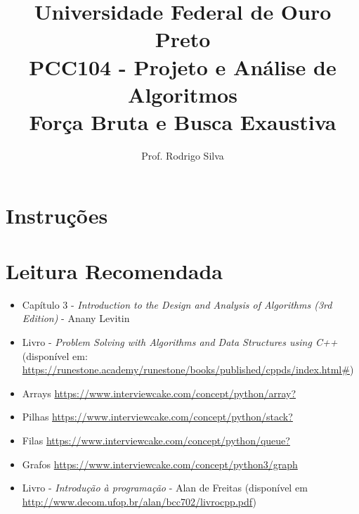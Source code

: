 \documentclass{article}
\title{\vspace{-2 cm}Universidade Federal de Ouro Preto \\ PCC104 - Projeto e Análise de Algoritmos \\ Força Bruta e Busca Exaustiva}
\author{Prof. Rodrigo Silva}
\begin{document}
\maketitle

\section*{Instruções}




\section{Leitura Recomendada}

\begin{itemize}
    \item Capítulo 3 - \textit{Introduction to the Design and Analysis of Algorithms (3rd Edition)} - Anany Levitin 
    \item Livro - \textit{Problem Solving with Algorithms and Data Structures using C++} (disponível em: \url{https://runestone.academy/runestone/books/published/cppds/index.html#})
    \item Arrays \url{https://www.interviewcake.com/concept/python/array?}
    \item Pilhas \url{https://www.interviewcake.com/concept/python/stack?}
    \item Filas \url{https://www.interviewcake.com/concept/python/queue?}
    \item Grafos \url{https://www.interviewcake.com/concept/python3/graph}
    \item Livro - \textit{Introdução à programação} - Alan de Freitas (disponível em \url{http://www.decom.ufop.br/alan/bcc702/livrocpp.pdf})
\end{itemize}
\end{document}
